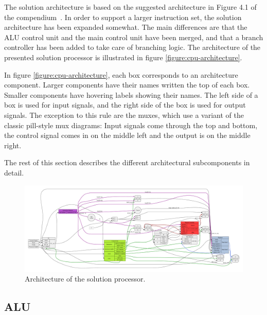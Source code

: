 The solution architecture is based on the suggested architecture in Figure 4.1 of the compendium~\cite[p.115]{compendium}.
In order to support a larger instruction set, the solution architecture has been expanded somewhat.
The main differences are that the ALU control unit and the main control unit have been merged, and that a branch controller has been added to take care of branching logic.
The architecture of the presented solution processor is illustrated in figure \vref{figure:cpu-architecture}.

In figure \vref{figure:cpu-architecture}, each box corresponds to an architecture component.
Larger components have their names written the top of each box.
Smaller components have hovering labels showing their names.
The left side of a box is used for input signals, and the right side of the box is used for output signals.
The exception to this rule are the muxes, which use a variant of the classic pill-style mux diagrams: Input signals come through the top and bottom, the control signal comes in on the middle left and the output is on the middle right.

The rest of this section describes the different architectural subcomponents in detail.

\begin{figure}
	\begin{center}
		\includegraphics[keepaspectratio, height=\textheight, width=\textwidth]{graphics/cpu-architecture/cpu-architecture-color.pdf}
		\caption{Architecture of the solution processor.}
		\label{figure:cpu-architecture}
	\end{center}
\end{figure}

\subsection{ALU}


\newpage


